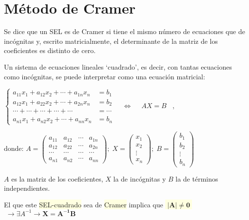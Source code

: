 \vspace{20mm}

\section{Método de Cramer}

\begin{defi}
Se dice que un SEL es de Cramer si tiene el mismo número de ecuaciones que de incógnitas y, escrito matricialmente, el determinante de la matriz de los coeficientes es distinto de cero.	
\end{defi}


Un sistema de ecuaciones lineales `cuadrado', es decir, con tantas ecuaciones como incógnitas, se puede interpretar como una ecuación matricial:

$\begin{cases} a_{11}x_1+a_{12}x_2 + \cdots + a_{1n}x_n &=b_1 \\
a_{12}x_1+a_{22}x_2 + \cdots + a_{2n}x_n &=b_2 \\
\cdots + \cdots + \cdots + \cdots + \cdots  &=\cdots \\
a_{n1}x_1+a_{n2}x_2+\cdots +a_{nn}x_n &=b_n  \end{cases} \quad \Leftrightarrow \quad \boxed{\; AX=B\; \; }$	,

donde:
$A=\left( \begin{matrix}  a_{11}&a_{12}& \cdots &a_{1n} \\
a_{12} &a_{22} &\cdots &a_{2n} \\
\cdots & \cdots & \cdots & \cdots  \\
a_{n1} &a_{n2} &\cdots &a_{nn}    \end{matrix} \right); \; X=\left( \begin{matrix} x_1\\x_2\\ \vdots \\x_n \end{matrix} \right); \; B=\left( \begin{matrix} b_1\\b_2\\ \vdots \\b_n \end{matrix} \right)$

$A$ es la matriz de los coeficientes, $X$ la de incógnitas y $B$ la de términos independientes.

El que este \colorbox{LightYellow}{SEL-cuadrado} sea de \colorbox{LightYellow}{Cramer} implica que \colorbox{LightYellow}{$\boldsymbol{ \; |A|\neq 0\; }$} $\; \to \exists A^{-1} \to \boldsymbol{ X=A^{-1}B }$

